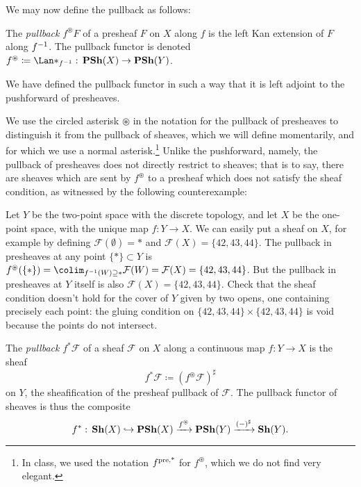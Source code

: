 We may now define the pullback as follows:
\begin{defn}
The \emph{pullback} \(f^{\circledast}F\) of a presheaf \(F\) on \(X\) along \(f\) is the left Kan extension of \(F\) along \(f^{-1}\).
The pullback functor is denoted \(f^{\circledast}\coloneq\Lan*_{f\inv}\colon\catPresheaf(X)\to\catPresheaf(Y)\).
\end{defn}

We have defined the pullback functor in such a way that it is left adjoint to the pushforward of presheaves.

We use the circled asterisk \(\circledast\) in the notation for the pullback of presheaves to distinguish it from the pullback of sheaves, which we will define momentarily, and for which we use a normal asterisk.\footnote{In class, we used the notation $f^{\textup{pre,*}}$ for $f^\circledast$, which we do not find very elegant.}
Unlike the pushforward, namely, the pullback of presheaves does not directly restrict to sheaves; that is to say, there are sheaves which are sent by \(f^{\circledast}\) to a presheaf which does not satisfy the sheaf condition, as witnessed by the following counterexample:

\begin{exmp}
Let $Y$ be the two-point space with the discrete topology, and let $X$ be the one-point space, with the unique map $f: Y \to X$. 
We can easily put a sheaf on $X$, for example by defining $\mathcal{F}(\emptyset) = *$ and $\mathcal{F}(X) = \{42, 43, 44\}$. 
The pullback in presheaves at any point $\{*\} \subset Y$ is $f^{\circledast}(\{*\}) = \colim_{f^{-1}(W) \supseteq *}\mathcal{F}(W) = \mathcal{F}(X) = \{42, 43, 44\}$. But the pullback in presheaves at $Y$ itself is also $\mathcal{F}(X) = \{42, 43, 44\}$. Check that the sheaf condition doesn't hold for the cover of $Y$ given by two opens, one containing precisely each point: the gluing condition on $\{42,43,44\} \times \{42, 43, 44\}$ is void because the points do not intersect.
\end{exmp}

\begin{defn}
The \emph{pullback} \(f^*\mathcal F\) of a sheaf \(\mathcal F\) on \(X\) along a continuous map \(f\colon Y\to X\) is the sheaf
\[ f^*\mathcal F \coloneq (f^{\circledast}\mathcal F)^\sharp \]
on \(Y\), the sheafification of the presheaf pullback of \(\mathcal F\).
The pullback functor of sheaves is thus the composite
\[ f^* \colon \catSheaf(X) \hookrightarrow \catPresheaf(X) \xrightarrow{f^{\circledast}} \catPresheaf(Y) \xrightarrow{(-)^\sharp} \catSheaf(Y)\text{.} \]
\end{defn}

